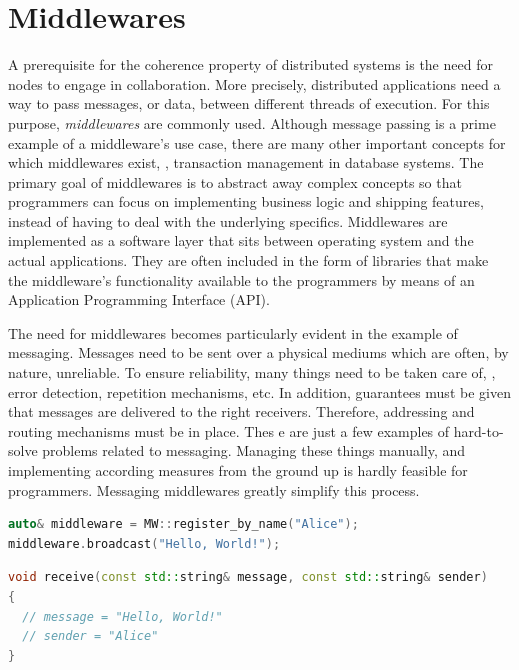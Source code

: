 \section{Middlewares} \label{sec:middlewares}
A prerequisite for the coherence property of distributed systems is the need for nodes to engage in collaboration. More precisely, distributed applications need a way to pass messages, or data, between different threads of execution. For this purpose, \emph{middlewares} \cite{bernstein1996middleware} are commonly used. Although message passing is a prime example of a middleware's use case, there are many other important concepts for which middlewares exist, \eg , transaction management in database systems. The primary goal of middlewares is to abstract away complex concepts so that programmers can focus on implementing business logic and shipping features, instead of having to deal with the underlying specifics. Middlewares are implemented as a software layer that sits between operating system and the actual applications. They are often included in the form of libraries that make the middleware's functionality available to the programmers by means of an Application Programming Interface (API).

The need for middlewares becomes particularly evident in the example of messaging. Messages need to be sent over a physical mediums which are often, by nature, unreliable. To ensure reliability, many things need to be taken care of, \eg , error detection, repetition mechanisms, etc. In addition, guarantees must be given that messages are delivered to the right receivers. Therefore, addressing and routing mechanisms must be in place. Thes
e are just a few examples of hard-to-solve problems related to messaging. Managing these things manually, and implementing according measures from the ground up is hardly feasible for programmers. Messaging middlewares greatly simplify this process.

\begin{lstlisting}[caption={[Middleware send example]A code snippet demonstrating a broadcast dispatch via middleware}, label={lst:send}, language={C++}]
auto& middleware = MW::register_by_name("Alice");
middleware.broadcast("Hello, World!");
\end{lstlisting}

\begin{lstlisting}[caption={[Middleware receive example]An exemplary callback function to receive messages via middleware}, label={lst:receive}, language={C++}]
void receive(const std::string& message, const std::string& sender)
{
  // message = "Hello, World!"
  // sender = "Alice"
}
\end{lstlisting}

